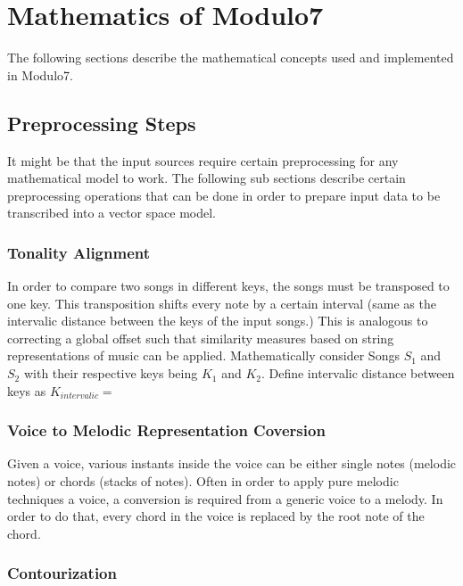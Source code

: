 \chapter{Mathematics of Modulo7}
\label{sec:mir math}

\noindent The following sections describe the mathematical concepts used and implemented in Modulo7.

\section{Preprocessing Steps} \label{sim:preprocess}

\noindent It might be that the input sources require certain preprocessing for any mathematical model to work. The following sub sections describe certain preprocessing operations that can be done in order to prepare input data to be transcribed into a vector space model. 

\subsection{Tonality Alignment} \label{tonalityalignment}

\noindent In order to compare two songs in different keys, the songs must be transposed to one key. This transposition shifts every note by a certain interval (same as the intervalic distance between the keys of the input songs.) This is analogous to correcting a global offset such that similarity measures based on string representations of music can be applied. Mathematically consider Songs $S_1$ and $S_2$ with their respective keys being $K_1$ and $K_2$. Define intervalic distance between keys as $K_{intervalic} = $ 

\subsection{Voice to Melodic Representation Coversion} \label{voicemelconv} 

\noindent Given a voice, various instants inside the voice can be either single notes (melodic notes) or chords (stacks of notes). Often in order to apply pure melodic techniques a voice, a conversion is required from a generic voice to a melody. In order to do that, every chord in the voice is replaced by the root note of the chord. 

\subsection{Contourization} \label{contourization}

